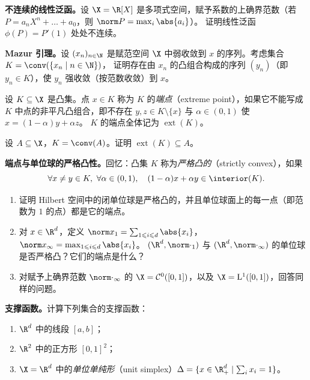 \begin{exercise}[原讲义 B.1 练习 6]
\label{exo:B1-6}
\textbf{不连续的线性泛函。}设 $\X=\R[X]$ 是多项式空间，赋予系数的上确界范数（若 $P=a_nX^n+\dots+a_0$，则 $\norm P=\max_i\abs{a_i}$）。
证明线性泛函 $\phi(P)=P'(1)$ 处处不连续。
\end{exercise}

\begin{exercise}[原讲义 B.1 练习 7]
\label{exo:B1-7}
\textbf{Mazur 引理。}设 $(x_n)_{n\in\N}$ 是赋范空间 $\X$ 中弱收敛到 $x$ 的序列。考虑集合 $K=\conv(\{x_n\mid n\in\N\})$，
证明存在由 $x_n$ 的凸组合构成的序列 $(y_n)$（即 $y_n\in K$），使 $y_n$ 强收敛（按范数收敛）到 $x$。
\end{exercise}

\begin{definition}[端点]
\label{def:42}
设 $K\subseteq\X$ 是凸集。点 $x\in K$ 称为 $K$ 的\emph{端点}（extreme point），如果它不能写成 $K$ 中点的非平凡凸组合，即不存在 $y,z\in K\setminus\{x\}$ 与 $\alpha\in(0,1)$ 使 $x=(1-\alpha)y+\alpha z$。
$K$ 的端点全体记为 $\operatorname{ext}(K)$。
\end{definition}

\begin{exercise}[原讲义 B.1 练习 8]
\label{exo:B1-8}
设 $A\subseteq\X$，$K=\conv(A)$。证明 $\operatorname{ext}(K)\subseteq A$。
\end{exercise}

\begin{exercise}[原讲义 B.1 练习 9]
\label{exo:B1-9}
\textbf{端点与单位球的严格凸性。}回忆：凸集 $K$ 称为\emph{严格凸的}（strictly convex），如果
\[
  \forall x\neq y\in K,\ \forall\alpha\in(0,1),\quad(1-\alpha)x+\alpha y\in\interior(K).
\]
\begin{enumerate}[label=\arabic*.]
  \item 证明 Hilbert 空间中的闭单位球是严格凸的，并且单位球面上的每一点（即范数为 $1$ 的点）都是它的端点。
  \item 对 $x\in\R^d$，定义 $\norm x_1=\sum_{1\leqslant i\leqslant d}\abs{x_i}$，$\norm x_\infty=\max_{1\leqslant i\leqslant d}\abs{x_i}$。
        $(\R^d,\norm\cdot_1)$ 与 $(\R^d,\norm\cdot_\infty)$ 的单位球是否严格凸？它们的端点是什么？
  \item 对赋予上确界范数 $\norm\cdot_\infty$ 的 $\X=\mathcal C^0([0,1])$，以及 $\X=\mathrm L^1([0,1])$，回答同样的问题。
\end{enumerate}
\end{exercise}

\begin{exercise}[原讲义 B.1 练习 10]
\label{exo:B1-10}
\textbf{支撑函数。}计算下列集合的支撑函数：
\begin{enumerate}[label=\arabic*.]
  \item $\R^d$ 中的线段 $[a,b]$；
  \item $\R^2$ 中的正方形 $[0,1]^2$；
  \item $\X=\R^d$ 中的\emph{单位单纯形}（unit simplex）$\Delta=\{x\in\R^d_+\mid\sum_ix_i=1\}$。
\end{enumerate}
\end{exercise}

